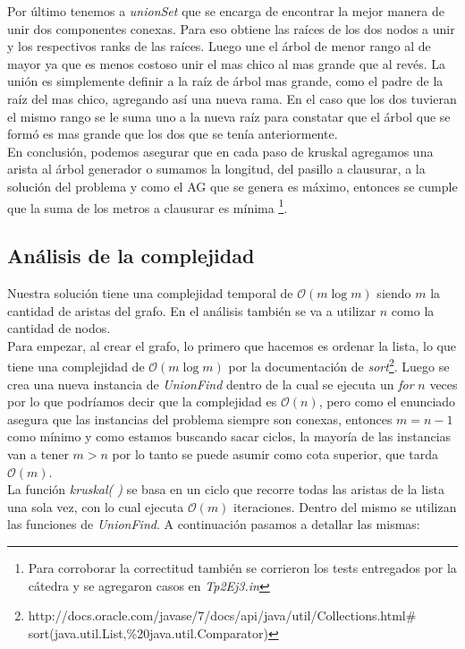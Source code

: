 Por último tenemos a \textit{unionSet} que se encarga de encontrar la mejor manera de unir dos componentes conexas. Para eso obtiene las raíces de los dos nodos a unir y los respectivos ranks de las raíces. Luego une el árbol de menor rango al de mayor ya que es menos costoso unir el mas chico al mas grande que al revés. La unión es simplemente definir a la raíz de árbol mas grande, como el padre de la raíz del mas chico, agregando así una nueva rama. En el caso que los dos tuvieran el mismo rango se le suma uno a la nueva raíz para constatar que el árbol que se formó es mas grande que los dos que se tenía anteriormente.\\

En conclusión, podemos asegurar que en cada paso de kruskal agregamos una arista al árbol generador o sumamos la longitud, del pasillo a clausurar, a la solución del problema y como el AG que se genera es máximo, entonces se cumple que la suma de los metros a clausurar es mínima \footnote{Para corroborar la correctitud también se corrieron los tests entregados por la cátedra y se agregaron casos en \emph{Tp2Ej3.in}}.

\subsection{Análisis de la complejidad}
Nuestra solución tiene una complejidad temporal de $\mathcal{O}(m\log{}m)$ siendo $m$ la cantidad de aristas del grafo. En el análisis también se va a utilizar $n$ como la cantidad de nodos.\\

Para empezar, al crear el grafo, lo primero que hacemos es ordenar la lista, lo que tiene una complejidad de $\mathcal{O}(m\log{}m)$ por la documentación de \textit{sort}\footnote{http://docs.oracle.com/javase/7/docs/api/java/util/Collections.html$\#$sort(java.util.List,\%20java.util.Comparator)}. Luego se crea una nueva instancia de \textit{UnionFind} dentro de la cual se ejecuta un \emph{for} $n$ veces por lo que podríamos decir que la complejidad es $\mathcal{O}(n)$, pero como el enunciado asegura que las instancias del problema siempre son conexas, entonces $m = n-1$ como mínimo y como estamos buscando sacar ciclos, la mayoría de las instancias van a tener $m > n$ por lo tanto se puede asumir como cota superior, que tarda $\mathcal{O}(m)$.\\

La función \textit{kruskal( )} se basa en un ciclo que recorre todas las aristas de la lista una sola vez, con lo cual ejecuta $\mathcal{O}(m)$ iteraciones. Dentro del mismo se utilizan las funciones de \textit{UnionFind}. A continuación pasamos a detallar las mismas:

